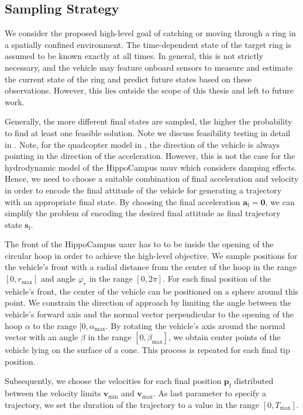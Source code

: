\subsection{Sampling Strategy}
\label{sec:sampling-strategy}
We consider the proposed high-level goal of catching or moving through a ring in a spatially confined environment. The time-dependent state of the target ring is assumed to be known exactly at all times. In general, this is not strictly necessary, and the vehicle may feature onboard sensors to measure and estimate the current state of the ring and predict future states based on these observations.
However, this lies outside the scope of this thesis and left to future work.

Generally, the more different final states are sampled, the higher the probability to find at least one feasible solution. Note we discuss feasibility testing in detail in . 
Note, for the quadcopter model in \cite{MuellerHehn15}, the direction of the vehicle is always pointing in the direction of the acceleration.
However, this is not the case for the hydrodynamic model of the HippoCampus \ac{uauv} which considers damping effects. 
Hence, we need to choose a suitable combination of final acceleration and velocity in order to encode the final attitude of the vehicle for generating a trajectory with an appropriate final state.
By choosing the final acceleration $\bm{a}_\text{f} = \bm{0}$, we can simplify the problem of encoding the desired final attitude as final trajectory state $\bm{s}_\text{f}$.

The front of the HippoCampus \ac{uauv} has to to be inside the opening of the circular hoop in order to achieve the high-level objective.
We sample positions for the vehicle's front with a radial distance from the center of the hoop in the range $[0, r_{\max}]$ and angle $\varphi_r$ in the range $[0, 2\pi]$.
For each final position of the vehicle's front, the center of the vehicle can be positioned on a sphere around this point. We constrain the direction of approach by limiting the angle between the vehicle's forward axis and the normal vector perpendicular to the opening of the hoop $\alpha$ to the range $[0, \alpha_{\max}$. By rotating the vehicle's axis around the normal vector with an angle $\beta$ in the range $[0, \beta_{\max}]$, we obtain center points of the vehicle lying on the surface of a cone. This process is repeated for each final tip position. 

Subsequently, we choose the velocities for each final position $\bm{p}_\text{f}$ distributed between the velocity limits $\bm{v}_{\min}$ and $\bm{v}_{\max}$. As last parameter to specify a trajectory, we set the duration of the trajectory to a value in the range $[0, T_{\max}]$.


